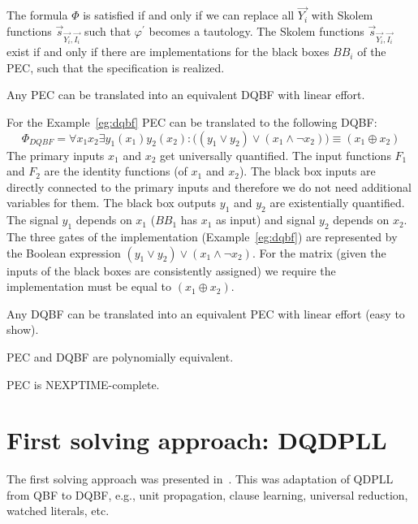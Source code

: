 \documentclass[runningheads]{llncs}
\begin{document}
The formula $\Phi$ is satisfied if and only if we can replace
all $\overrightarrow{Y_i}$ with Skolem functions $\overrightarrow{s}_{\overrightarrow{Y_i},\overrightarrow{I_i}}$ such that $\varphi^{\prime}$ becomes a tautology.
The Skolem functions $\overrightarrow{s}_{\overrightarrow{Y_i},\overrightarrow{I_i}}$ exist if and only if there are implementations for the black boxes $BB_i$ of the PEC, such that the specification is realized.

\begin{lemma}
  Any PEC can be translated into an equivalent DQBF with linear effort.
\end{lemma}


\begin{example}
  For the Example~\ref{eg:dqbf} PEC can be translated to the following DQBF:
\begin{equation} \nonumber
  \Phi_{DQBF} = \forall x_1 x_2 \exists y_1 (x_1) y_2 (x_2) :
  \big( (y_1 \lor y_2) \lor (x_1 \land \neg x_2) \big) \equiv (x_1 \oplus x_2)
\end{equation}
The primary inputs $x_1$ and $x_2$ get universally quantified.
The input functions $F_1$ and $F_2$ are the identity functions (of $x_1$ and $x_2$).
The black box inputs are directly connected to the primary inputs and therefore we do not need additional variables for them.
The black box outputs $y_1$ and $y_2$ are existentially quantified.
The signal $y_1$ depends on $x_1$ ($BB_1$ has $x_1$ as input) and signal $y_2$ depends on $x_2$.
The three gates of the implementation (Example~\ref{eg:dqbf}) are represented by the Boolean expression $(y_1 \lor y_2) \lor (x_1 \land \neg x_2)$.
For the matrix (given the inputs of the black boxes are consistently assigned) we require the implementation must be equal to $(x_1 \oplus x_2)$.
\end{example}

\begin{lemma}
  Any DQBF can be translated into an equivalent PEC with linear effort (easy to show).
\end{lemma}

\begin{theorem}
  PEC and DQBF are polynomially equivalent.
\end{theorem}

\begin{corollary}
  PEC is NEXPTIME-complete.
\end{corollary}

\section{First solving approach: DQDPLL}
The first solving approach was presented in~\cite{frohlich2012dpll}.
%
This was adaptation of QDPLL from QBF to DQBF, e.g., unit propagation, clause
learning, universal reduction, watched literals, etc.
%
\end{document}
